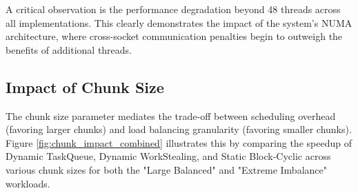 \documentclass[10pt]{article}
\begin{document}
A critical observation is the performance degradation beyond 48 threads across all implementations. This clearly demonstrates the impact of the system's NUMA architecture, where cross-socket communication penalties begin to outweigh the benefits of additional threads.

\subsection{Impact of Chunk Size}
The chunk size parameter mediates the trade-off between scheduling overhead (favoring larger chunks) and load balancing granularity (favoring smaller chunks). Figure \ref{fig:chunk_impact_combined} illustrates this by comparing the speedup of Dynamic TaskQueue, Dynamic WorkStealing, and Static Block-Cyclic across various chunk sizes for both the "Large Balanced" and "Extreme Imbalance" workloads.
\end{document}
